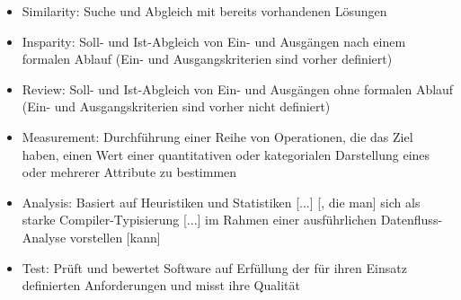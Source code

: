 \begin{itemize}
	\item Similarity: Suche und Abgleich mit bereits vorhandenen Lösungen \cite[S. 122]{HelgaMeyer.}
	\item Insparity: Soll- und Ist-Abgleich von Ein- und Ausgängen nach einem formalen Ablauf (Ein- und Ausgangskriterien sind vorher definiert) \cite[vgl. S. 308]{PeterLiggesmeyer.2009}
	\item Review: Soll- und Ist-Abgleich von Ein- und Ausgängen ohne formalen Ablauf (Ein- und Ausgangskriterien sind vorher nicht definiert) \cite[vgl. S. 317]{PeterLiggesmeyer.2009}
	\item Measurement: Durchführung einer Reihe von Operationen, die das Ziel haben, einen Wert einer quantitativen oder kategorialen Darstellung eines oder mehrerer Attribute zu bestimmen \cite[vgl. S. 395]{DepartmentofResearch&DevelopmentDepartmentofInformationTechnologiesandSystems.}
	\item Analysis: Basiert auf Heuristiken und Statistiken [...] [, die man] sich als starke Compiler-Typisierung [...] im Rahmen einer ausführlichen Datenfluss-Analyse vorstellen [kann] \cite[vgl. S. 4]{JayAbrahamPaulJonesRaoulJetley.}
	\item Test: Prüft und bewertet Software auf Erfüllung der für ihren Einsatz definierten Anforderungen und misst ihre Qualität \cite{Wikipedia.01.03.2020}
\end{itemize}
